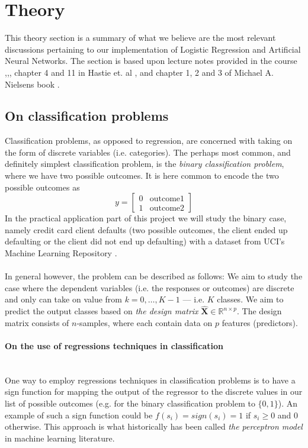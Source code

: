 \documentclass[10pt, a4paper, twocolumn]{article}
\newcommand{\myparagraph}[1]{\paragraph{#1}\mbox{}\\}
\begin{document}
\section{Theory}
	This theory section is a summary of what we believe are the most relevant discussions pertaining to our implementation of Logistic Regression and Artificial Neural Networks. The section is based upon lecture notes provided in the course \cite{LectureNotesLogisticReg},\cite{LectureNotesOptGradientMethods},\cite{LectureNotesNNDL}, chapter 4 and 11 in Hastie et. al \cite{ElementsOfStatLearning}, and chapter 1, 2 and 3 of Michael A. Nielsens book \cite{NNandDL}.
	\subsection{On classification problems}
		Classification problems, as opposed to regression, are concerned with taking on the form of discrete variables (i.e. categories). The perhaps most common, and definitely simplest classification problem, is the \emph{binary classification problem}, where we have two possible outcomes. It is here common to encode the two possible outcomes as
			$$ y = \begin{bmatrix} 0 &\mathrm{outcome 1} \\ 1 & \mathrm{outcome 2} \end{bmatrix} $$
		In the practical application part of this project we will study the binary case, namely credit card client defaults (two possible outcomes, the client ended up defaulting or the client did not end up defaulting) with a dataset from UCI's Machine Learning Repository \cite{UCImlRepoCCdata}. \\\\
		
		In general however, the problem can be described as follows: We aim to study the case where the dependent variables (i.e. the responses or outcomes) are discrete and only can take on value from $k = 0,\dots,K-1$ --- i.e. $K$ classes. We aim to predict the output classes based on \emph{the design matrix} $\mathbf{\hat{X}} \in \mathbb{R} ^{n\times p}$. The design matrix consists of $n$-samples, where each contain data on $p$ features (predictors).
		
	\myparagraph{On the use of regressions techniques in classification}
		One way to employ regressions techniques in classification problems is to have a sign function for mapping the output of the regressor to the discrete values in our list of possible outcomes (e.g. for the binary classification problem to $\{0,1\}$). An example of such a sign function could be $f(s_i)=sign(s_i)=1$ if $s_i\geq 0$ and $0$ otherwise. This approach is what historically has been called \emph{the perceptron model} in machine learning literature.\cite{LectureNotesLogisticReg}\\\\
		
\end{document}
